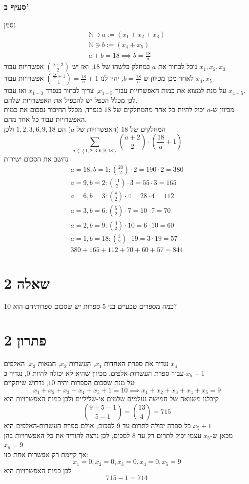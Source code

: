 \documentclass[12pt, titlepage]{article}
\begin{document}
\section*{סעיף ב'}
נסמן
\begin{gather*}
    \mathbb{N} \ni  a := \left(x_1+x_2+x_3\right) \\
    \mathbb{N}  \ni b:= \left(x_4+x_5\right) \\
    a + b = 18 \implies b= \frac{18}{a}
\end{gather*}
נוכל לבחור את $a$ כמחלק כלשהו של $18$, ואז יש $\binom{a+2}{2}$ אפשרויות עבור $x_1,x_2,x_3$\\
לאחר מכן מכיוון ש-$b=\frac{18}{a}$, יהיו לנו $\binom{\frac{18}{a}+1}{1} =\frac{18}{a}+1$ אפשרויות עבור $x_4,x_5$ \\
על מנת למצוא את כמות האפשרויות עבור $x_{1-5}$, צריך לבחור בנפרד $x_{1-3}$ ואז עבור $x_{4-5}$.\\
לכן מכלל הכפל יש להכפיל את האפשרויות שלהם.\\ 
מכיוון ש-$a$ יכול להיות כל אחד מהמחלקים של $18$ בנפרד, מכלל החיבור נסכום את כמות האפשרויות עבור כל אחד מהם.\\
המחלקים של $18$ (האפשרויות של $a$) הם $1,2,3,6,9,18$ ולכן
\[
    \sum_{a\in \left\{1,2,3,6,9,18\right\}} \binom{a+2}{2} \cdot \left(\frac{18}{a} + 1\right)
\]
נחשב את הסכום ישירות
\begin{gather*}
    a=18,b=1 : \binom{20}{2} \cdot 2 = 190 \cdot 2 = 380 \\
    a=9,b=2 : \binom{11}{2} \cdot 3 = 55 \cdot 3 = 165 \\
    a=6,b=3 : \binom{8}{2} \cdot 4 = 28 \cdot 4 = 112 \\
    a=3,b=6 : \binom{5}{2} \cdot 7 = 10 \cdot 7 = 70 \\
    a=2,b=9 : \binom{4}{2} \cdot 10 = 6 \cdot 10  = 60 \\
    a=1,b=18: \binom{3}{2} \cdot 19 = 3 \cdot 19 = 57 \\
\boxed{380 + 165 + 112 + 70 + 60 + 57 = 844}
\end{gather*}
\newpage
\part*{שאלה 2}
כמה מספרים טבעיים בני $5$ ספרות יש שסכום ספרותיהם הוא 10?
\part*{פתרון 2}
נגדיר את ספרת האחדות $x_1$, העשרות $x_2$, המאות $x_3$, האלפים $x_4$\\
עבור ספרת העשרות-אלפים, מכיוון שהיא לא יכולה להיות $0$, נגדיר כ-$x_5+1$ \\
על מנת שסכום הספרות יהיה $10$, נדרוש שיתקיים:
\[
    x_1 + x_2 + x_3 + x_4 + x_5 + 1 = 10 \implies x_1 + x_2 + x_3 + x_4 + x_5 = 9
\]
קיבלנו משוואה של חמישה נעלמים שלמים אי-שליליים ולכן כמות האפשרויות היא
\[
    \binom{9+5-1}{5-1} = \binom{13}{4} = 715
\]
כל ספרה יכולה לתרום עד $9$ לסכום, אולם ספרת העשרות-האלפים היא $x_5+1$ \\
מכאן ש-$x_5$ עצמו יכול לתרום רק עד $8$ לסכום, לכן נרצה להוריד את כל האפשרויות בהן $x_5=9$\\
אך קיימת רק אפשרות אחת כזו:
\[
    x_1=0,x_2=0,x_3=0,x_4=0,x_5=9
\]
לכן כמות האפשרויות היא
\[
\boxed{715-1 = 714}
\]
\newpage
\end{document}
